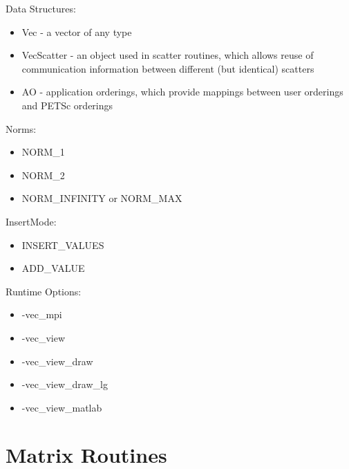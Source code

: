 \noindent
Data Structures: 
\begin{itemize}
\item Vec - a vector of any type
\item VecScatter - an object used in scatter routines, which allows
      reuse of communication information between different (but identical)
      scatters
\item AO - application orderings, which provide mappings between user orderings
           and PETSc orderings
\end{itemize}
Norms:
\begin{itemize}
\item NORM\_1
\item NORM\_2
\item NORM\_INFINITY or NORM\_MAX  
\end{itemize}
InsertMode:
\begin{itemize}
\item INSERT\_VALUES
\item ADD\_VALUE
\end{itemize}
Runtime Options:
\begin{itemize}
\item -vec\_mpi
\item -vec\_view
\item -vec\_view\_draw
\item -vec\_view\_draw\_lg
\item -vec\_view\_matlab
\end{itemize}


{\small
\noindent

}

\section{Matrix Routines}

